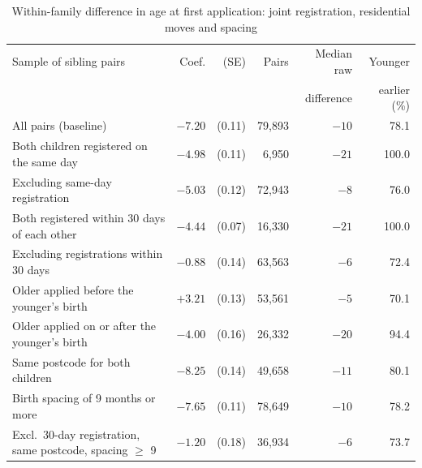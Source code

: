 \begin{table}[htbp]\centering
\caption{Within-family difference in age at first application: joint registration, residential moves and spacing}
\label{tab:siblingsN2}
\footnotesize
\setlength{\tabcolsep}{4pt}
\begin{tabular}{lrrrrr}
\toprule
Sample of sibling pairs & Coef. & (SE) & Pairs & Median raw & Younger \\
 & & & & difference & earlier (\%) \\
\midrule
All pairs (baseline) & $-7.20$ & (0.11) & 79,893 & $-10$ & 78.1 \\
Both children registered on the same day & $-4.98$ & (0.11) & 6,950 & $-21$ & 100.0 \\
Excluding same-day registration & $-5.03$ & (0.12) & 72,943 & $-8$ & 76.0 \\
Both registered within 30 days of each other & $-4.44$ & (0.07) & 16,330 & $-21$ & 100.0 \\
Excluding registrations within 30 days & $-0.88$ & (0.14) & 63,563 & $-6$ & 72.4 \\
Older applied before the younger's birth & $+3.21$ & (0.13) & 53,561 & $-5$ & 70.1 \\
Older applied on or after the younger's birth & $-4.00$ & (0.16) & 26,332 & $-20$ & 94.4 \\
Same postcode for both children & $-8.25$ & (0.14) & 49,658 & $-11$ & 80.1 \\
Birth spacing of 9 months or more & $-7.65$ & (0.11) & 78,649 & $-10$ & 78.2 \\
Excl.\ 30-day registration, same postcode, spacing $\geq$ 9 & $-1.20$ & (0.18) & 36,934 & $-6$ & 73.7 \\
\bottomrule
\end{tabular}
\end{table}
